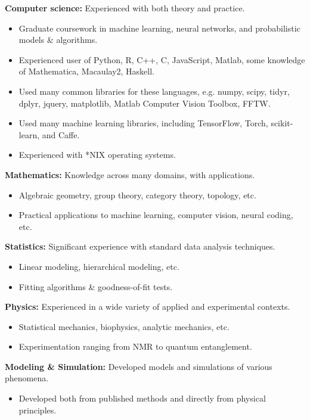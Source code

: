 \documentclass[margin]{res}
\begin{document}
\begin{resume}
{\bf Computer science:} Experienced with both theory and practice. 
\begin{itemize} \itemsep -2pt
  \item Graduate coursework in machine learning, neural networks, and probabilistic models \& algorithms.
  \item Experienced user of Python, R, C++, C, JavaScript, Matlab, some knowledge of Mathematica, Macaulay2, Haskell. 
  \item Used many common libraries for these languages, e.g. numpy, scipy, tidyr, dplyr, jquery, matplotlib, Matlab Computer Vision Toolbox, FFTW.
  \item Used many machine learning libraries, including TensorFlow, Torch, scikit-learn, and Caffe.
  \item Experienced with *NIX operating systems.
\end{itemize}\vspace{-8pt}
{\bf Mathematics:} Knowledge across many domains, with applications.
\begin{itemize} \itemsep -2pt
\item Algebraic geometry, group theory, category theory, topology, etc. \item Practical applications to machine learning, computer vision, neural coding, etc. \end{itemize}\vspace{-8pt}
{\bf Statistics:} Significant experience with standard data analysis techniques.
\begin{itemize} \itemsep -2pt
  \item Linear modeling, hierarchical modeling, etc.
  \item Fitting algorithms \& goodness-of-fit tests. \end{itemize} \vspace{-8pt}
{\bf Physics:} Experienced in a wide variety of applied and experimental contexts.\begin{itemize} \itemsep -2pt
\item Statistical mechanics, biophysics, analytic mechanics, etc. \item Experimentation ranging from NMR to quantum entanglement. \end{itemize}\vspace{-8pt}
{\bf Modeling \& Simulation:} Developed models and simulations of various phenomena. 
\begin{itemize} \itemsep -2pt
  \item Developed both from published methods and directly from physical principles. \end{itemize}

\end{resume}
\end{document}
